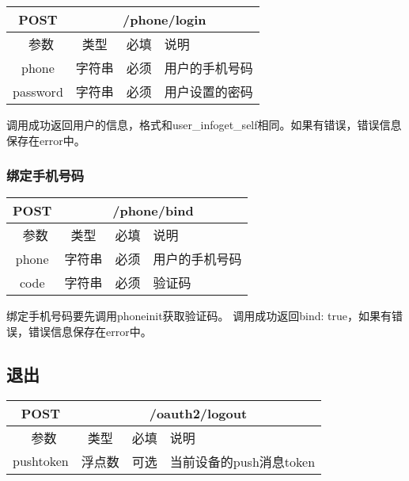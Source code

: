 \begin{table}[H]
   \begin{center}
\begin{tabular}{|c|c|c|p{12cm}|}
\hline
POST & \multicolumn{3}{|c|}{/phone/login} \\
\hline\hline
 \  参数  & 类型 & 必填 &  说明  \\
\hline
 phone  & 字符串 & 必须 &  用户的手机号码\\
\hline
 password  & 字符串 & 必须 &  用户设置的密码\\
\hline
\end{tabular}
   \end{center}
\end{table}

调用成功返回用户的信息，格式和user\_info\/get\_self相同。如果有错误，错误信息保存在error中。



\subsubsection{绑定手机号码}
\label{hash_algorithm}

\begin{table}[H]
   \begin{center}
\begin{tabular}{|c|c|c|p{12cm}|}
\hline
POST & \multicolumn{3}{|c|}{/phone/bind} \\
\hline\hline
 \  参数  & 类型 & 必填 &  说明  \\
\hline
 phone  & 字符串 & 必须 &  用户的手机号码\\
\hline
 code  & 字符串 & 必须 &  验证码\\
\hline
\end{tabular}
   \end{center}
\end{table}

绑定手机号码要先调用phone\/init获取验证码。
调用成功返回{bind: true}，如果有错误，错误信息保存在error中。



\subsection{退出}

\begin{table}[H]
   \begin{center}
\begin{tabular}{|c|c|c|p{12cm}|}
\hline
POST & \multicolumn{3}{|c|}{/oauth2/logout} \\
\hline\hline
 \  参数  & 类型 & 必填 &  说明  \\
\hline
    pushtoken  & 浮点数 & 可选 &  当前设备的push消息token\\
\hline
\end{tabular}
   \end{center}
\end{table}

